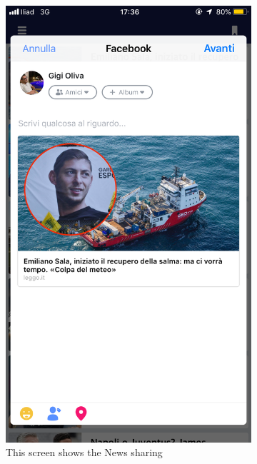 \documentclass[numbers=noenddot, 12pt, a4paper, oneside]{scrbook}
\begin{document}
\begin{figure}[H]
		\begin{subfigure}{.5\textwidth}
		\centering
		\includegraphics[width=.8\linewidth]{images/Screen/Share}
		\caption{This screen shows the News sharing}
	\end{subfigure}
	\begin{subfigure}{.5\textwidth}
		\centering

\end{subfigure}
\end{figure}
\end{document}
